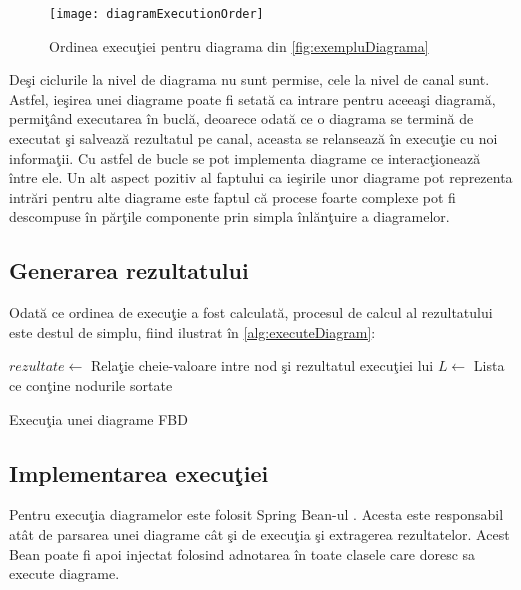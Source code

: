 \begin{figure}[H]
	\centering
	\texttt{[image: diagramExecutionOrder]}
	\caption{Ordinea execuţiei pentru diagrama din \cref{fig:exempluDiagrama}}
	\label{fig:executionOrder}
\end{figure}

Deşi ciclurile la nivel de diagrama nu sunt permise, cele la nivel de canal sunt. Astfel, ieşirea unei diagrame poate fi setată ca intrare pentru aceeaşi diagramă, permiţând executarea în buclă, deoarece odată ce o diagrama se termină de executat şi salvează rezultatul pe canal, aceasta se relansează în execuţie cu noi informaţii. Cu astfel de bucle se pot implementa diagrame ce interacţionează între ele. Un alt aspect pozitiv al faptului ca ieşirile unor diagrame pot reprezenta intrări pentru alte diagrame este faptul că procese foarte complexe pot fi descompuse în părţile componente prin simpla înlănţuire a diagramelor.

\subsection{Generarea rezultatului}
Odată ce ordinea de execuţie a fost calculată, procesul de calcul al rezultatului este destul de simplu, fiind ilustrat în \cref{alg:executeDiagram}:

\begin{algorithm}[H]
	$rezultate \gets$ Relaţie cheie-valoare intre nod şi rezultatul execuţiei lui\;
	$L \gets$ Lista ce conţine nodurile sortate \;
	
	{}
	\label{alg:executeDiagram}
	\caption{Execuţia unei diagrame FBD}
\end{algorithm}

\subsection{Implementarea execuţiei}
Pentru execuţia diagramelor este folosit Spring Bean-ul . Acesta este responsabil atât de parsarea unei diagrame cât şi de execuţia şi extragerea rezultatelor. Acest Bean poate fi apoi injectat folosind adnotarea  în toate clasele care doresc sa execute diagrame.


